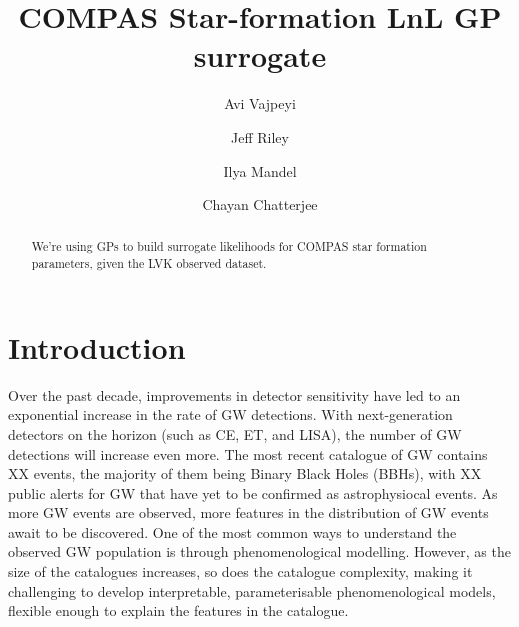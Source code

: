 \documentclass[twocolumn]{aastex631}
\newcommand{\resp}[1]{#1}
\begin{document}
\title{\resp{COMPAS Star-formation LnL GP surrogate}}

\author{Avi Vajpeyi}


\author{Jeff Riley}
\author{Ilya Mandel}
\author{Chayan Chatterjee}
\affiliation{}




\begin{abstract}
    We're using GPs to build surrogate likelihoods for COMPAS star formation parameters, given the LVK observed dataset.
\end{abstract}




\section{Introduction}
\label{sec:intro}
Over the past decade, improvements in detector sensitivity have led to an exponential increase in the rate of GW detections.
With next-generation detectors on the horizon (such as CE, ET, and LISA), the number of GW detections will increase even more.
The most recent catalogue of GW contains
XX events, the majority of them being Binary Black Holes
(BBHs), with XX public alerts for GW that have yet to be confirmed as astrophysiocal events.
As more GW events are observed, more features
in the distribution of GW events await to be discovered.
One of the most common ways to understand the observed GW population is through phenomenological modelling.
However, as the size of the catalogues increases, so does the catalogue complexity, making it challenging to develop interpretable, parameterisable phenomenological models, flexible enough to explain the features in the catalogue.
\end{document}
